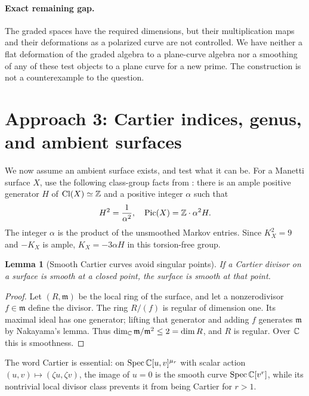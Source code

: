 \documentclass[11pt]{article}
\newtheorem{lemma}[theorem]{Lemma}
\theoremstyle{remark}\newtheorem{remark}[theorem]{Remark}
\begin{document}
\paragraph{Exact remaining gap.}
The graded spaces have the required dimensions, but their multiplication maps and their deformations as a polarized curve are not controlled. We have neither a flat deformation of the graded algebra to a plane-curve algebra nor a smoothing of any of these test objects to a plane curve for a new prime. The construction is not a counterexample to the question.

\section{Approach 3: Cartier indices, genus, and ambient surfaces}
We now assume an ambient surface exists, and test what it can be. For a Manetti surface $X$, use the following class-group facts from \cite[Thm.~1.6]{DS}: there is an ample positive generator $H$ of $\operatorname{Cl}(X)\simeq\mathbb Z$ and a positive integer $\alpha$ such that
\[
 H^2=\frac1{\alpha^2},\quad \operatorname{Pic}(X)=\mathbb Z\cdot\alpha^2H.
\]
The integer $\alpha$ is the product of the unsmoothed Markov entries. Since $K_X^2=9$ and $-K_X$ is ample, $K_X=-3\alpha H$ in this torsion-free group.

\begin{lemma}[Smooth Cartier curves avoid singular points]\label{lem:local}
If a Cartier divisor on a surface is smooth at a closed point, the surface is smooth at that point.
\end{lemma}
\begin{proof}
Let $(R,\mathfrak m)$ be the local ring of the surface, and let a nonzerodivisor $f\in\mathfrak m$ define the divisor. The ring $R/(f)$ is regular of dimension one. Its maximal ideal has one generator; lifting that generator and adding $f$ generates $\mathfrak m$ by Nakayama's lemma. Thus $\dim_\mathbb C\mathfrak m/\mathfrak m^2\leq2=\dim R$, and $R$ is regular. Over $\mathbb C$ this is smoothness.
\end{proof}
The word Cartier is essential: on $\operatorname{Spec}\mathbb C[u,v]^{\mu_r}$ with scalar action $(u,v)\mapsto(\zeta u,\zeta v)$, the image of $u=0$ is the smooth curve $\operatorname{Spec}\mathbb C[v^r]$, while its nontrivial local divisor class prevents it from being Cartier for $r>1$.
\end{document}

